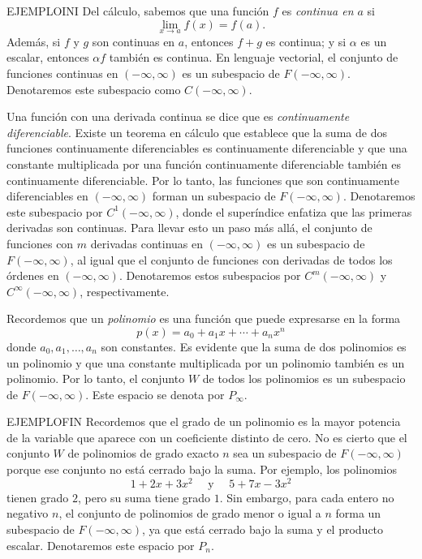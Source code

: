\begin{examplebox}{}{EJEMPLOINI}
    Del cálculo, sabemos que una función $f$ es \emph{continua en $a$} si
    $$\lim_{x \to a} f(x) = f(a).$$
    Además, si $f$ y $g$ son continuas en $a$, entonces $f + g$ es continua; y si $\alpha$ es un escalar, entonces $\alpha f$ también es continua. En lenguaje vectorial, el conjunto de funciones continuas en $(-\infty, \infty)$ es un subespacio de $F(-\infty, \infty)$. Denotaremos este subespacio como $C(-\infty, \infty)$.
\end{examplebox}

\begin{examplebox}{}{}
    Una función con una derivada continua se dice que es \emph{continuamente diferenciable}. Existe un teorema en cálculo que establece que la suma de dos funciones continuamente diferenciables es continuamente diferenciable y que una constante multiplicada por una función continuamente diferenciable también es continuamente diferenciable. Por lo tanto, las funciones que son continuamente diferenciables en $(-\infty, \infty)$ forman un subespacio de $F(-\infty, \infty)$. Denotaremos este subespacio por $C^1(-\infty, \infty)$, donde el superíndice enfatiza que las primeras derivadas son continuas. Para llevar esto un paso más allá, el conjunto de funciones con $m$ derivadas continuas en $(-\infty, \infty)$ es un subespacio de $F(-\infty, \infty)$, al igual que el conjunto de funciones con derivadas de todos los órdenes en $(-\infty, \infty)$. Denotaremos estos subespacios por $C^m(-\infty, \infty)$ y $C^{\infty}(-\infty, \infty)$, respectivamente.
\end{examplebox}

\begin{examplebox}{}{}
    Recordemos que un \emph{polinomio} es una función que puede expresarse en la forma
    $$p(x) = a_0 + a_1x + \cdots + a_nx^n$$
    donde $a_0, a_1, \dots, a_n$ son constantes. Es evidente que la suma de dos polinomios es un polinomio y que una constante multiplicada por un polinomio también es un polinomio. Por lo tanto, el conjunto $W$ de todos los polinomios es un subespacio de $F(-\infty, \infty)$. Este espacio se denota por $P_{\infty}$.
\end{examplebox}

\begin{examplebox}{}{EJEMPLOFIN}
    Recordemos que el grado de un polinomio es la mayor potencia de la variable que aparece con un coeficiente distinto de cero. No es cierto que el conjunto $W$ de polinomios de grado exacto $n$ sea un subespacio de $F(-\infty, \infty)$ porque ese conjunto no está cerrado bajo la suma. Por ejemplo, los polinomios
    $$1 + 2x + 3x^2 \quad \text{ y } \quad 5 + 7x - 3x^2$$
    tienen grado $2$, pero su suma tiene grado $1$. Sin embargo, para cada entero no negativo $n$, el conjunto de polinomios de grado menor o igual a $n$ forma un subespacio de $F(-\infty, \infty)$, ya que está cerrado bajo la suma y el producto escalar. Denotaremos este espacio por $P_n$.
\end{examplebox}

